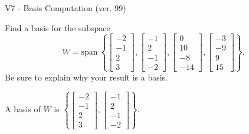 \begin{exercise}
  \begin{exerciseTitle}V7 - Basis Computation (ver. 99)\end{exerciseTitle}
  \begin{exerciseStatement}
    Find a basis for the subspace 
\[W=\mathrm{span}\ \left\{\left[\begin{array}{r}
-2 \\
-1 \\
2 \\
3
\end{array}\right] , \left[\begin{array}{r}
-1 \\
2 \\
-1 \\
-2
\end{array}\right] , \left[\begin{array}{r}
0 \\
10 \\
-8 \\
-14
\end{array}\right] , \left[\begin{array}{r}
-3 \\
-9 \\
9 \\
15
\end{array}\right]\right\}.\]
 Be sure to explain why your result is a basis.


  \end{exerciseStatement}
  \begin{exerciseAnswer}
   A basis of \(W\) is  \(\left\{\left[\begin{array}{r}
-2 \\
-1 \\
2 \\
3
\end{array}\right] , \left[\begin{array}{r}
-1 \\
2 \\
-1 \\
-2
\end{array}\right]\right\}\).
  


  \end{exerciseAnswer}
\end{exercise}